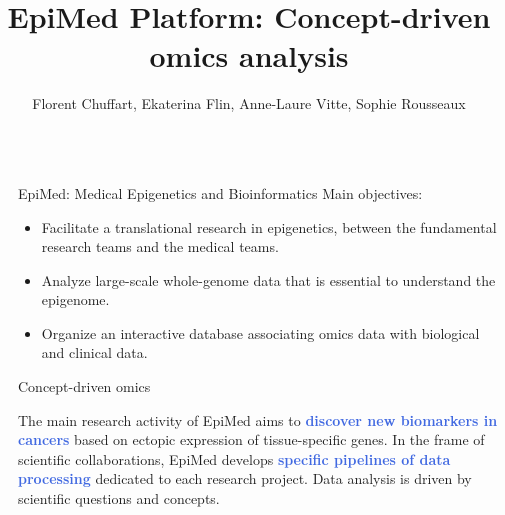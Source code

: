 \documentclass[final]{beamer}
\title{EpiMed Platform: Concept-driven omics analysis} %
\author{Florent Chuffart, Ekaterina Flin, Anne-Laure Vitte, Sophie Rousseaux} %
\institute{Institute for Advanced Biosciences (IAB), Université Grenoble Alpes} %
\newlength{\sepwid}
\newlength{\twocolwid}
\begin{document}

\setlength{\belowcaptionskip}{2ex} %
\setlength\belowdisplayshortskip{2ex} %

\begin{frame}[t] %

\begin{columns}[t] %

\begin{column}{\sepwid}\end{column} %

\begin{column}{\twocolwid} %


\begin{alertblock}{EpiMed: Medical Epigenetics and Bioinformatics}
Main objectives:
\begin{itemize}
\item Facilitate a translational research in epigenetics, between the fundamental research teams and the medical teams.
\item Analyze large-scale whole-genome data that is essential to understand the epigenome.
\item Organize an interactive database associating omics data with biological and clinical data.
\end{itemize}

\end{alertblock}



\begin{block}{Concept-driven omics}

The main research activity of EpiMed aims to \textcolor{RoyalBlue}{\textbf{discover new biomarkers in cancers}} based on ectopic expression of tissue-specific genes. In the frame of scientific collaborations, EpiMed develops \textcolor{RoyalBlue}{\textbf{specific pipelines of data processing}} dedicated to each research project. Data analysis is driven by scientific questions and concepts.


\end{block}
\end{column}
\end{columns}
\end{frame}
\end{document}
